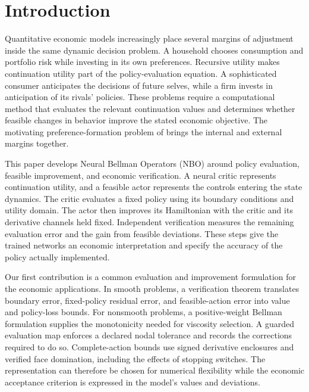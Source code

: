 \section{Introduction}\label{sec:introduction}
Quantitative economic models increasingly place several margins of adjustment inside the same dynamic decision problem. A household chooses consumption and portfolio risk while investing in its own preferences. Recursive utility makes continuation utility part of the policy-evaluation equation. A sophisticated consumer anticipates the decisions of future selves, while a firm invests in anticipation of its rivals' policies. These problems require a computational method that evaluates the relevant continuation values and determines whether feasible changes in behavior improve the stated economic objective. The motivating preference-formation problem of \citet{qi2025} brings the internal and external margins together.

This paper develops Neural Bellman Operators (NBO) around policy evaluation, feasible improvement, and economic verification. A neural critic represents continuation utility, and a feasible actor represents the controls entering the state dynamics. The critic evaluates a fixed policy using its boundary conditions and utility domain. The actor then improves its Hamiltonian with the critic and its derivative channels held fixed. Independent verification measures the remaining evaluation error and the gain from feasible deviations. These steps give the trained networks an economic interpretation and specify the accuracy of the policy actually implemented.

Our first contribution is a common evaluation and improvement formulation for the economic applications. In smooth problems, a verification theorem translates boundary error, fixed-policy residual error, and feasible-action error into value and policy-loss bounds. For nonsmooth problems, a positive-weight Bellman formulation supplies the monotonicity needed for viscosity selection. A guarded evaluation map enforces a declared nodal tolerance and records the corrections required to do so. Complete-action bounds use signed derivative enclosures and verified face domination, including the effects of stopping switches. The representation can therefore be chosen for numerical flexibility while the economic acceptance criterion is expressed in the model's values and deviations.

